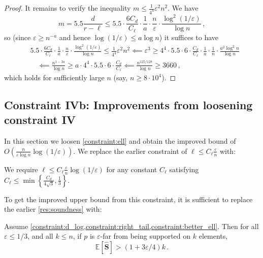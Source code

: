 \documentclass{theoretics}
\newcommand{\Ex}[1]{\bE \left[ #1 \right]}
\newcommand{\bE}{\ensuremath{\mathbb{E}}}
\renewcommand{\epsilon}{\varepsilon}
\begin{document}
\begin{proof}
    It remains to verify the inequality $m \leq \frac{1}{4^4} \epsilon^2 n^2$. We have
    \[
        m = 5.5 \frac{d}{r-\ell}
        \le 5.5 \cdot \frac{6 C_d}{C_\ell} \cdot \frac{1}{a} \cdot \frac{n}{\epsilon}
            \cdot \frac{\log^2(1/\epsilon)}{\log n} \,,
    \]
    so (since $\epsilon \geq n^{-a}$ and hence $\log(1/\epsilon) \le a \log n$) it suffices to have
    \begin{align*}
        &5.5 \cdot \frac{6 C_d}{C_\ell} \cdot \frac{1}{a} \cdot \frac{n}{\epsilon}
                \cdot \frac{\log^2(1/\epsilon)}{\log n}
            \le \frac{1}{4^4} \epsilon^2 n^2
        \impliedby
            \epsilon^3 \geq 4^4 \cdot 5.5 \cdot 6 \cdot \frac{C_d}{C_\ell} \cdot \frac{1}{a}
            \cdot \frac{1}{n} \cdot \frac{a^2 \log^2 n}{\log n}
        \\
        &\quad \impliedby
            \frac{n^{1-3a}}{\log n} \geq a \cdot 4^4 \cdot 5.5 \cdot 6 \cdot \frac{C_d}{C_\ell}
        \impliedby \frac{n^{125/128}}{\log n} \ge 3660 \,,
    \end{align*}
    which holds for sufficiently large $n$ (say, $n \ge 8 \cdot 10^4$).
\end{proof}

\subsection{Constraint IVb: Improvements from loosening constraint IV}
\label{section:improved-bound}

In this section we loosen \cref{constraint:ell} and obtain the improved bound of
$O\left(\tfrac{n}{\epsilon \log n}\log(1/\epsilon)\right)$. We replace the earlier constraint of
$\ell \leq C_\ell \tfrac{\epsilon}{n}$ with:

\begin{constraint}
\label{constraint:better_ell}
We require $\ell \leq C_\ell \tfrac{\epsilon}{n} \log(1/\epsilon)$ for any constant $C_\ell$
satisfying $C_\ell \leq \min\left\{\frac{C_d}{4\sqrt{3}}, \frac{1}{3}\right\}$.
\end{constraint}

To get the improved upper bound from this constraint, it is sufficient to replace the earlier
\cref{res:soundness} with:

\begin{lemma}
    \label{res:soundness_improved}
    Assume \cref{constraint:d_log,constraint:right_tail,constraint:better_ell}.  Then for all
    $\epsilon \leq 1/3$, and all $k \leq n$, if $p$ is $\epsilon$-far from being supported on $k$
    elements,
    \[
        \Ex{\bm{\widehat S}} > (1 + 3\epsilon/4) k \,.
    \]
\end{lemma}
\end{document}
